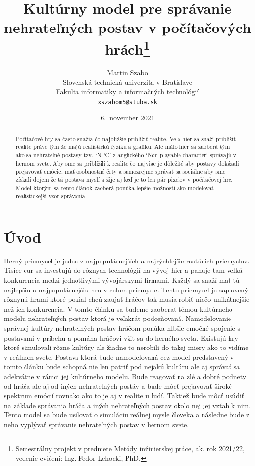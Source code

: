 \documentclass[10pt,twoside,slovak,a4paper]{article}
\title{Kultúrny model pre správanie nehrateľných postav v počítačových hrách\thanks{Semestrálny projekt v predmete Metódy inžinierskej práce, ak\@. rok 2021/22, vedenie cvičení: Ing. Fedor Lehocki, PhD.}}
\author{Martin Szabo\\[2pt]
	{\small Slovenská technická univerzita v Bratislave}\\
	{\small Fakulta informatiky a informačných technológií}\\
	{\small \texttt{xszabom5@stuba.sk}}
	}
\date{\small 6.\ november 2021}
\begin{document}
\maketitle
\begin{abstract}

Počítačové hry sa často snažia čo najbližšie priblížiť realite. Veľa hier sa snaží priblížiť realite práve tým že 
majú realistickú fyziku a grafiku. Ale málo hier sa zaoberá tým ako sa nehrateľné postavy tzv. `NPC' z anglického
`Non-playable character' správajú v hernom svete. Aby sme sa priblížili k realite čo najviac je dôležité aby postavy
dokázali prejavovať emócie, mať osobnostné črty a samozrejme správať sa sociálne aby sme získali dojem že tá postava
myslí a žije aj keď je to len pár pixelov v počítačovej hre. Model ktorým sa tento článok zaoberá ponúka lepšie
možnosti ako modelovať realistickejší vzor správania.

\end{abstract}


\section{Úvod}

Herný priemysel je jeden z najpopulárnejších a najrýchlejšie rastúcich priemyslov.
Tisíce eur sa investujú do rôznych technológií na vývoj hier a panuje tam veľká konkurencia
medzi jednotlivými vývojárskymi firmami. Každý sa snaží mať tú najlepšiu a najpopulárnejšiu
hru v celom priemysle. Tento priemysel je zaplavený rôznymi hrami ktoré pokiaľ chcú zaujať hráčov
tak musia robiť niečo unikátnejšie než ich konkurencia. V tomto článku sa budeme zaoberať témou
kultúrneho modelu nehrateľných postav ktorá je veľakrát podceňovaná. Namodelovanie správnej kultúry
nehrateľných postav hráčom ponúka hlbšie emočné spojenie s postavami v príbehu a pomáha hráčovi
vžiť sa do herného sveta. Existujú hry ktoré simulovali rôzne kultúry ale žiadne to nerobili do takej 
miery ako to vidíme v reálnom svete. Postava ktorá bude namodelovaná cez model predstavený v 
tomto článku bude schopná nie len patriť pod nejakú kultúru ale aj správať sa adekvátne v rámci
jej kultúrneho modelu. Bude reagovať na zlé a dobré podnety od hráča ale aj od iných nehrateľných 
postáv a bude môcť prejavovať široké spektrum emócií rovnako ako to je aj v realite u ľudí. Taktiež bude 
môcť usúdiť na základe správania hráča a iných nehrateľných postav okolo nej jej vzťah k nim. Tento model
sa bude usilovať o simuláciu reálnej mysle človeka a následne bude z neho vyplývať správanie nehrateľných
postav v hernom svete.
\end{document}
